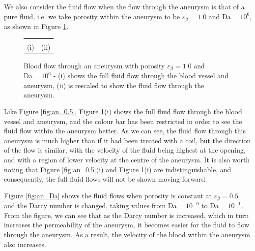 \documentclass[a4paper, 11pt]{report}
\begin{document}
We also consider the fluid flow when the flow through the aneurysm is that of a pure fluid, i.e. we take porosity within the aneurysm to be $\varepsilon_\beta=1.0$ and $\mathrm{Da}=10^{6}$, as shown in Figure \ref{fig:an_fluid}.

\begin{figure}[!htb]
    \centering
    \begin{tabular}{c c}
      &  \\
    (i) & (ii) 
    \end{tabular}
    \caption[Blood flow through an aneurysm as a pure fluid]{Blood flow through an aneurysm with porosity $\varepsilon_\beta=1.0$ and $\mathrm{Da}=10^{6}$ - (i) shows the full fluid flow through the blood vessel and aneurysm, (ii) is rescaled to show the fluid flow through the aneurysm.} \label{fig:an_fluid}
\end{figure}


Like Figure \ref{fig:an_0.5}, Figure \ref{fig:an_fluid}(i) shows the full fluid flow through the blood vessel and aneurysm, and the colour bar has been restricted in order to see the fluid flow within the aneurysm better. As we can see, the fluid flow through this aneurysm is much higher than if it had been treated with a coil, but the direction of the flow is similar, with the velocity of the fluid being highest at the opening, and with a region of lower velocity at the centre of the aneurysm. It is also worth noting that Figure \ref{fig:an_0.5}(i) and Figure \ref{fig:an_fluid}(i) are indistinguishable, and consequently, the full fluid flows will not be shown moving forward.


Figure \ref{fig:an_Da} shows the fluid flows when porosity is constant at $\varepsilon_\beta = 0.5$ and the Darcy number is changed, taking values from $\mathrm{Da} = 10^{-6}$ to $\mathrm{Da} = 10^{-1}$. From the figure, we can see that as the Darcy number is increased, which in turn increases the permeability of the aneurysm, it becomes easier for the fluid to flow through the aneurysm. As a result, the velocity of the blood within the aneurysm also increases.
\end{document}
